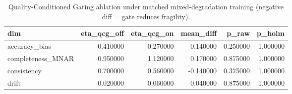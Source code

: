 \begin{table}
\caption{Quality-Conditioned Gating ablation under matched mixed-degradation training (negative diff = gate reduces fragility).}
\label{tab:G_qcg}
\begin{tabular}{lrrrrr}
\toprule
dim & eta_qcg_off & eta_qcg_on & mean_diff & p_raw & p_holm \\
\midrule
accuracy\_bias & 0.410000 & 0.270000 & -0.140000 & 0.250000 & 1.000000 \\
completeness\_MNAR & 0.950000 & 1.120000 & 0.170000 & 0.875000 & 1.000000 \\
consistency & 0.700000 & 0.560000 & -0.140000 & 0.375000 & 1.000000 \\
drift & 0.020000 & 0.060000 & 0.040000 & 0.875000 & 1.000000 \\
\bottomrule
\end{tabular}
\end{table}

